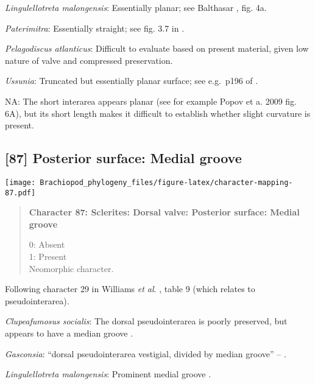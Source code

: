 \documentclass[openany]{book}
\theoremstyle{definition}
\theoremstyle{definition}
\theoremstyle{definition}
\theoremstyle{remark}
\begin{document}
\hypertarget{Lingulellotreta_malongensis-coding-86}{}
\emph{Lingulellotreta malongensis}: Essentially planar; see Balthasar
\citeyearpar{Balthasar2009Thebrachiopod}, fig. 4a.

\hypertarget{Paterimitra-coding-86}{}
\emph{Paterimitra}: Essentially straight; see fig. 3.7 in
\citet{Ushatinskaya2016Protegulumand}.

\hypertarget{Pelagodiscus_atlanticus-coding-86}{}
\emph{Pelagodiscus atlanticus}: Difficult to evaluate based on present
material, given low nature of valve and compressed preservation.

\hypertarget{Ussunia-coding-86}{}
\emph{Ussunia}: Truncated but essentially planar surface; see e.g.~p196
of \citet{Topper2013Reappraisalof}.

\hypertarget{NA-coding-86}{}
NA: The short interarea appears planar (see for example Popov et a. 2009
fig. 6A), but its short length makes it difficult to establish whether
slight curvature is present.

\subsection*{{[}87{]} Posterior surface: Medial
groove}\label{posterior-surface-medial-groove}

\texttt{[image: Brachiopod\_phylogeny\_files/figure-latex/character-mapping-87.pdf]}

\begin{quote}
\textbf{Character 87: Sclerites: Dorsal valve: Posterior surface: Medial
groove}

0: Absent\\
1: Present\\
Neomorphic character.
\end{quote}

Following character 29 in Williams \emph{et al}.
\citeyearpar{Williams2000LinguliformeaCraniiformea}, table 9 (which
relates to pseudointerarea).

\hypertarget{Clupeafumosus_socialis-coding-87}{}
\emph{Clupeafumosus socialis}: The dorsal pseudointerarea is poorly
preserved, but appears to have a median groove
\citep{Holmer2006Aspinose}.

\hypertarget{Gasconsia-coding-87}{}
\emph{Gasconsia}: ``dorsal pseudointerarea vestigial, divided by median
groove'' -- \citet{Williams2000LinguliformeaCraniiformea}.

\hypertarget{Lingulellotreta_malongensis-coding-87}{}
\emph{Lingulellotreta malongensis}: Prominent medial groove
\citep{Balthasar2009Thebrachiopod}.
\end{document}
